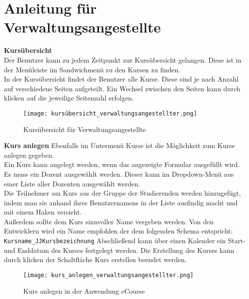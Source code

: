 
\chapter{Anleitung für Verwaltungsangestellte}
\label{sec:chap1}
\textbf{Kursübersicht}\\
Der Benutzer kann zu jedem Zeitpunkt zur Kursübersicht gelangen. Diese ist in der Menüleiste im Sandwichmenü zu den Kursen zu finden.\\
In der Kursübersicht findet der Benutzer alle Kurse. Diese sind je nach Anzahl auf verschiedene Seiten aufgeteilt. Ein Wechsel zwischen den Seiten kann durch klicken auf die jeweilige Seitenzahl erfolgen. 

\begin{figure}[h]
\centering
\texttt{[image: kursübersicht\_verwaltungsangestellter.png]}
\caption{Kursübersicht für Verwaltungsangestellte}
\label{fib:kü}
\end{figure}

\textbf{Kurs anlegen}
Ebenfalls im Untermenü Kurse ist die Möglichkeit zum Kurse anlegen gegeben.\\
Ein Kurs kann angelegt werden, wenn das angezeigte Formular ausgefüllt wird. Es muss ein Dozent ausgewählt werden. Dieser kann im Dropdown-Menü aus einer Liste aller Dozenten ausgewählt werden. \\
Die Teilnehmer am Kurs aus der Gruppe der Studierenden werden hinzugefügt, indem man sie anhand ihres Benutzernamens in der Liste ausfindig macht und mit einem Haken versieht. \\
Außerdem sollte dem Kurs sinnvoller Name vergeben werden. Von den Entwicklern wird ein Name empfohlen der dem folgenden Schema entspricht: \\
\verb/Kursname_JJKursbezeichnung/
Abschließend kann über einen Kalender ein Start- und Enddatum des Kurses festgelegt werden. 
Die Erstellung des Kurses kann durch klicken der Schaltfläche \glqq Kurs erstellen\grqq\: beendet werden.

\begin{figure}[h]
\centering
\texttt{[image: kurs\_anlegen\_verwaltungsangestellter.png]}
\caption{Kurs anlegen in der Anwendung eCourse}
\label{fib:kü}
\end{figure}


